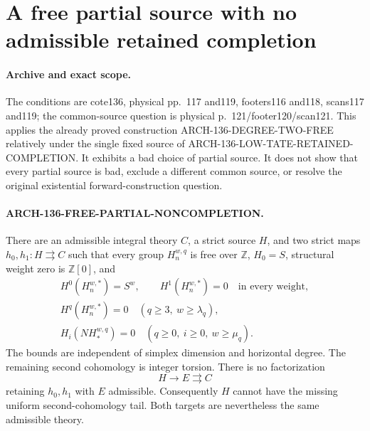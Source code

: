 \section{A free partial source with no admissible retained completion}
\label{sec:136-free-partial-noncompletion}

\paragraph{Archive and exact scope.}
The conditions are cote136, physical pp.~117 and119,
footers116 and118, scans117 and119; the common-source question
is physical p.~121/footer120/scan121.
This applies the already proved construction
ARCH-136-DEGREE-TWO-FREE relatively under the single fixed
source of ARCH-136-LOW-TATE-RETAINED-COMPLETION.
It exhibits a bad choice of partial source. It does not show that
every partial source is bad, exclude a different common source,
or resolve the original existential forward-construction question.

\paragraph{ARCH-136-FREE-PARTIAL-NONCOMPLETION.}
There are an admissible integral theory \(C\), a strict source
\(H\), and two strict maps \(h_0,h_1:H\rightrightarrows C\)
such that every group \(H_n^{w,q}\) is free over \(\mathbb Z\),
\(H_0=S\), structural weight zero is \(\mathbb Z[0]\), and
\[
\begin{gathered}
 H^0(H_n^{w,*})=S^w,\qquad H^1(H_n^{w,*})=0
                         \quad\text{in every weight},\\
 H^q(H_n^{w,*})=0
                  \quad(q\geq3,\ w\geq\lambda_q),\\
 H_i(NH_*^{w,q})=0
                  \quad(q\geq0,\ i\geq0,\ w\geq\mu_q).
\end{gathered}                                         \tag{136.FPN1}
\]
The bounds are independent of simplex dimension and horizontal
degree. The remaining second cohomology is integer torsion.
There is no factorization
\[
 H\longrightarrow E\rightrightarrows C
                                                        \tag{136.FPN2}
\]
retaining \(h_0,h_1\) with \(E\) admissible.
Consequently \(H\) cannot have the missing uniform second-cohomology
tail. Both targets are nevertheless the same admissible theory.

